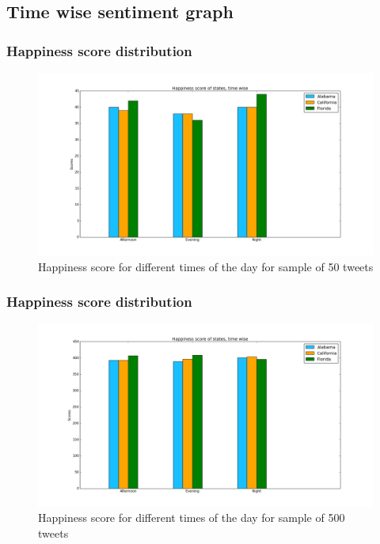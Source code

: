 \documentclass{beamer}
\begin{document}
\subsection{Time wise sentiment graph}
\begin{frame}
\frametitle{Happiness score distribution}

\begin{figure}
\includegraphics[scale=0.3]{./Images/Time_in_day50}
\caption{Happiness score for different times of the day for sample of 50 tweets}
\end{figure}
\end{frame}
\begin{frame}
\frametitle{Happiness score distribution}

\begin{figure}
\includegraphics[scale=0.3]{./Images/Time_in_day500}
\caption{Happiness score for different times of the day for sample of 500 tweets}
\end{figure}
\end{frame}
\end{document}
